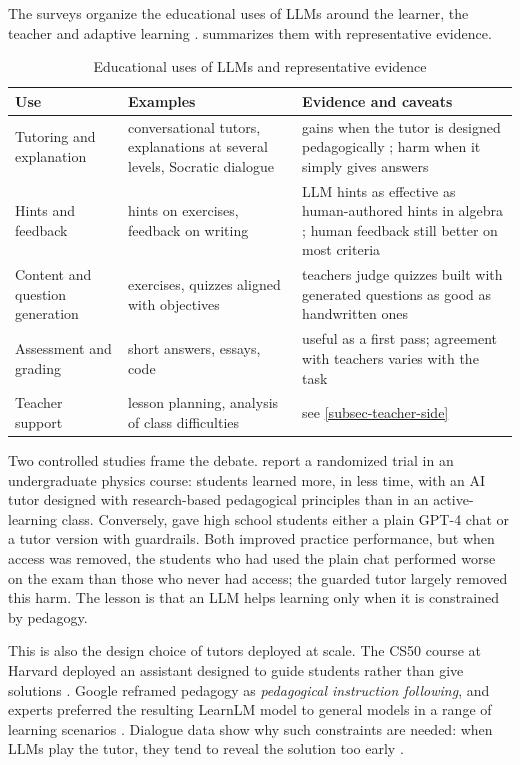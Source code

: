 The surveys organize the educational uses of LLMs around the learner, the
teacher and adaptive learning \cite{wang2024llm4edu,kasneci2023}.
 summarizes them with representative evidence.

\begin{table}[htbp]
\centering
\caption{Educational uses of LLMs and representative evidence}
\label{tab-llm-uses}
\small
\begin{tabularx}{\textwidth}{@{}L{2.8cm}YY@{}}
\toprule
\textbf{Use} & \textbf{Examples} & \textbf{Evidence and caveats} \\
\midrule
Tutoring and explanation & conversational tutors, explanations at several levels, Socratic dialogue & gains when the tutor is designed pedagogically \cite{kestin2025}; harm when it simply gives answers \cite{bastani2025} \\
Hints and feedback & hints on exercises, feedback on writing & LLM hints as effective as human-authored hints in algebra \cite{pardos2024}; human feedback still better on most criteria \cite{steiss2024} \\
Content and question generation & exercises, quizzes aligned with objectives & teachers judge quizzes built with generated questions as good as handwritten ones \cite{elkins2024,doughty2024} \\
Assessment and grading & short answers, essays, code & useful as a first pass; agreement with teachers varies with the task \cite{wang2024llm4edu} \\
Teacher support & lesson planning, analysis of class difficulties & see \cref{subsec-teacher-side} \\
\bottomrule
\end{tabularx}
\end{table}

Two controlled studies frame the debate. \citet{kestin2025} report a
randomized trial in an undergraduate physics course: students learned more,
in less time, with an AI tutor designed with research-based pedagogical
principles than in an active-learning class. Conversely,
\citet{bastani2025} gave high school students either a plain GPT-4 chat or
a tutor version with guardrails. Both improved practice performance, but
when access was removed, the students who had used the plain chat
performed worse on the exam than those who never had access; the guarded
tutor largely removed this harm. The lesson is that an LLM helps learning
only when it is constrained by pedagogy.

This is also the design choice of tutors deployed at scale. The CS50
course at Harvard deployed an assistant designed to guide students rather
than give solutions \cite{liu2024cs50}. Google reframed pedagogy as
\emph{pedagogical instruction following}, and experts preferred the
resulting LearnLM model to general models in a range of learning scenarios
\cite{learnlm2024}. Dialogue data show why such constraints are needed:
when LLMs play the tutor, they tend to reveal the solution too early
\cite{macina2023mathdial}.

